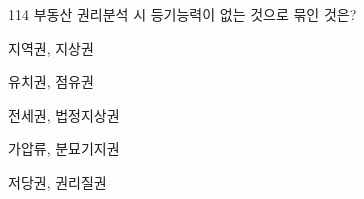 \begin{question}{114}
부동산 권리분석 시 등기능력이 없는 것으로 묶인 것은?
\begin{choices}
  \item 지역권, 지상권
  \item 유치권, 점유권
  \item 전세권, 법정지상권
  \item 가압류, 분묘기지권
  \item 저당권, 권리질권
\end{choices}
\end{question}
